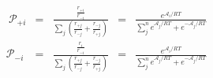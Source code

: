 \begin{eqnarray}\
{\mathcal P}_{+i}  & = & \frac{\frac{r_{+i}}{r_{-i}}}{\sum_j\left(\frac{r_{+j}}{r_{-j}} + \frac{r_{-j}}{r_{+j}}  \right)} & = & \frac{e^{\mathcal A_i/RT}}{\sum_j^n e^{\mathcal A_j/RT} + e^{-\mathcal A_j/RT}} \\
{\mathcal P}_{-i}  & = & \frac{\frac{r_{i}}{r_{-i}}}{\sum_j\left(\frac{r_{+j}}{r_{-j}} + \frac{r_{-j}}{r_{+j}}  \right)} & = & \frac{e^{\mathcal A_i/RT}}{\sum_j^n e^{\mathcal A_j/RT} + e^{-\mathcal A_j/RT}} \\
\end{eqnarray}